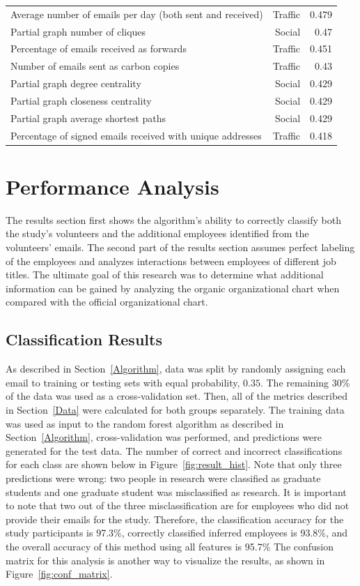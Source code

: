 \documentclass[12pt]{report}
\begin{document}
\begin{table}[t]
{\begin{tabular}{@{}lrr@{}}
Average number of emails per day (both sent and received) & Traffic & 0.479    \\
Partial graph number of cliques              & Social       & 0.47 \\
Percentage of emails received as forwards    & Traffic      & 0.451 \\
Number of emails sent as carbon copies       & Traffic      & 0.43 \\
Partial graph degree centrality              & Social       & 0.429 \\
Partial graph closeness centrality           & Social       & 0.429 \\
Partial graph average shortest paths         & Social       & 0.429 \\ 
Percentage of signed emails received with unique addresses & Traffic & 0.418\\ \bottomrule

\end{tabular}
}
\end{table}


\chapter{Performance Analysis} \label{Performance}
The results section first shows the algorithm's ability to correctly classify both the study's volunteers and the additional employees identified from the volunteers' emails.
The second part of the results section assumes perfect labeling of the employees and analyzes interactions between employees of different job titles.
The ultimate goal of this research was to determine what additional information can be gained by analyzing the organic organizational chart when compared with the official organizational chart.

\section{Classification Results}
As described in Section~\ref{Algorithm}, data was split by randomly assigning each email to training or testing sets with equal probability, $0.35$.
The remaining 30\% of the data was used as a cross-validation set.
Then, all of the metrics described in Section~\ref{Data} were calculated for both groups separately.
The training data was used as input to the random forest algorithm as described in Section~\ref{Algorithm}, cross-validation was performed, and predictions were generated for the test data.
The number of correct and incorrect classifications for each class are shown below in Figure~\ref{fig:result_hist}.
Note that only three predictions were wrong: two people in research were classified as graduate students and one graduate student was misclassified as research.
It is important to note that two out of the three misclassification are for employees who did not provide their emails for the study.
Therefore, the classification accuracy for the study participants is 97.3\%, correctly classified inferred employees is 93.8\%, and the overall accuracy of this method using all features is 95.7\%
The confusion matrix for this analysis is another way to visualize the results, as shown in Figure~\ref{fig:conf_matrix}.
\end{document}
